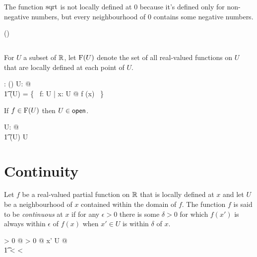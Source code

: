 \documentclass{amsart}
\begin{document}
\begin{remark}
The function $\operatorname{sqrt}$ is not locally defined at $0$ because it's defined only for non-negative numbers,
but every neighbourhood of $0$ contains some negative numbers.

\begin{zed}
	\sqrtR \notin \FunR(\zeroR)
\end{zed}

\end{remark}

\subsection{}

For $U$ a subset of $\mathbb{R}$,
let $\operatorname{F}(U)$ denote the set of all real-valued functions on $U$ that are locally defined at each point of $U$.

\begin{axdef}
	\FunPR: \power \R \fun \power (\R \pfun \R)
\where
	\forall U: \power \R @ \\
	\t1	\FunPR(U) = \{~ f: U \fun \R | \forall x: U @ f \in \FunR(x) ~\}
\end{axdef}

\begin{remark}
If $f \in \operatorname{F}(U)$ then $U \in \mathsf{open}$.

\begin{zed}
	\forall U: \power \R @ \\
	\t1	\FunPR(U) \neq \emptyset \implies U \in \openR
\end{zed}

\end{remark}

\section{Continuity}

Let $f$ be a real-valued partial function on $\mathbb{R}$ 
that is locally defined at $x$ and let $U$ be a neighbourhood of $x$
contained within the domain of $f$.
The function $f$ is said to be {\it continuous} at $x$ if 
for any $\epsilon > 0$ there is some $\delta > 0$ for which 
$f(x')$ is always within $\epsilon$ of $f(x)$
when $x' \in U$ is within $\delta$ of $x$.
\begin{argue}
\forall \epsilon > 0 @ \exists \delta > 0 @ \forall x' \in U @ \\
\t1	 < \delta \implies {} < \epsilon
\end{argue}
\end{document}
